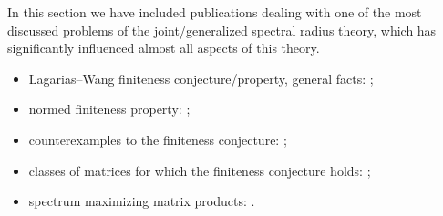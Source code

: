 \documentclass[a4paper,fleqn]{article}
\let\cite=\citep
\begin{document}
In this section we have included publications dealing with one of the most discussed problems of the joint/generalized spectral radius theory, which has significantly influenced almost all aspects of this theory.
\begin{itemize}
\item Lagarias--Wang finiteness conjecture/property, general facts: \cite{BTV:MTNS02, Charina:ACHA13, DHX:PAMS13, GugZen:LAA12, JenPoll:ETDS17, Koz:LAA16, Koz:WSDV16, LagWang:LAA95, Maesumi:TIC95, Morris:LAA10};
\item normed finiteness property: \cite{LiShih:LAA08};
\item counterexamples to the finiteness conjecture: \cite{BochiMor:PLMS15, BM:JAMS02, BTV:SIAMJMA03, CJ:IJAMCS07, HMST:AdvMath11, JenPoll:ETDS17, JP:SIAMJMA09, Koz:CDC05:e, Koz:WIAS05, Koz:INFOPROC06:e};
\item classes of matrices for which the finiteness conjecture holds: \cite{AhmJun14, AhmJng:NAHS16, BN:SIAMJMAA09, Charina:ACHA13, CGSZ:LAA10, CiconePhD11, Dai:ArXiv11, Dai:LAA13, DHLX:LAA12, DHX:ArXiv13-1, DHX:PAMS13, DK:INFOPROC11:e, Gurv:LAA95, GWZ:SIAMJMA05, JB:LAA08, JM:LAA13, Koz:LAA16, LagWang:LAA95, LiuXiao:LNCS12, Mejstrik:DRNA22, Morris:LAA10, Morris:ArXiv11, PanScl:Nonlin21, PW:LAA08, WangWen:CIS13};
\item spectrum maximizing matrix products:  \cite{BochiLas:ArXiv23, CGSZ:LAA10, JSRpack, GugProt:SIAMJMAA16, GugZen:LAA08}.
\end{itemize}
\end{document}
